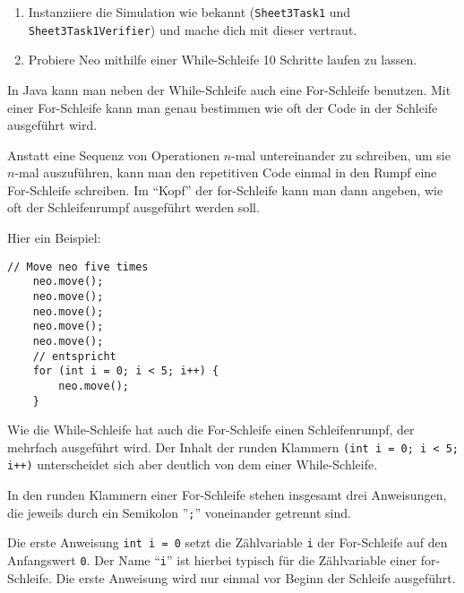 
\begin{enumerate}
	\item Instanziiere die Simulation wie bekannt (\lstinline{Sheet3Task1} und \lstinline{Sheet3Task1Verifier}) und mache dich mit dieser vertraut.
	\item Probiere Neo mithilfe einer While-Schleife 10 Schritte laufen zu lassen.\\

\end{enumerate}


\begin{Infobox}
	In Java kann man neben der While-Schleife auch eine For-Schleife benutzen.
	Mit einer For-Schleife kann man genau bestimmen wie oft der Code in der Schleife ausgeführt wird.\newline

	Anstatt eine Sequenz von Operationen $n$-mal untereinander zu schreiben, um sie $n$-mal auszuführen, kann man den repetitiven Code einmal in den Rumpf eine For-Schleife schreiben.
	Im \enquote{Kopf} der for-Schleife kann man dann angeben, wie oft der Schleifenrumpf ausgeführt werden soll.\newline

	Hier ein Beispiel:

	\begin{lstlisting}[numbers=none]
	// Move neo five times
	neo.move();
	neo.move();
	neo.move();
	neo.move();
	neo.move();
	// entspricht
	for (int i = 0; i < 5; i++) {
		neo.move();
	}
	\end{lstlisting}

	Wie die While-Schleife hat auch die For-Schleife einen Schleifenrumpf, der mehrfach ausgeführt wird.
Der Inhalt der runden Klammern \lstinline{(int i = 0; i < 5; i++)} unterscheidet sich aber deutlich von dem einer While-Schleife.\newline

In den runden Klammern einer For-Schleife stehen insgesamt drei Anweisungen, die jeweils durch ein Semikolon ''\lstinline{;}'' voneinander getrennt sind.

Die erste Anweisung \lstinline{int i = 0} setzt die Zählvariable \lstinline{i} der For-Schleife auf den Anfangswert \lstinline{0}.
Der Name \enquote{\lstinline{i}} ist hierbei typisch für die Zählvariable einer for-Schleife.
Die erste Anweisung wird nur einmal vor Beginn der Schleife ausgeführt.\newline


\end{Infobox}
